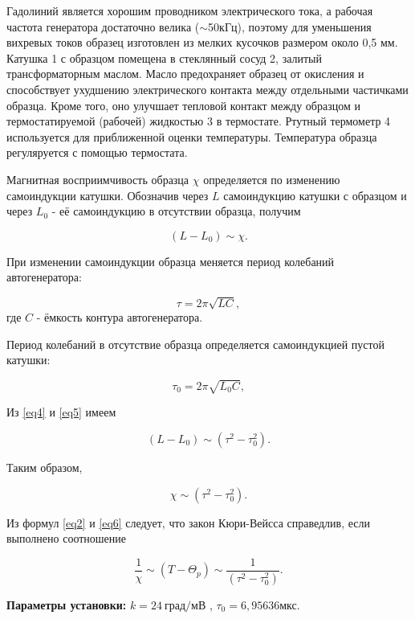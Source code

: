 \documentclass[a4paper, 12pt, twoside]{article}
\begin{document}
Гадолиний является хорошим проводником электрического тока, а рабочая частота генератора достаточно велика ($\sim$50кГц), поэтому для уменьшения вихревых токов образец изготовлен из мелких кусочков размером около 0,5 мм. Катушка 1 с образцом помещена в стеклянный сосуд 2, залитый трансформаторным маслом. Масло предохраняет образец от окисления и способствует ухудшению электрического контакта между отдельными частичками образца. Кроме того, оно улучшает тепловой контакт между образцом и термостатируемой (рабочей) жидкостью 3 в термостате. Ртутный термометр 4 используется для приближенной оценки температуры. Температура образца регуляруется с помощью термостата.

Магнитная восприимчивость образца $\chi$ определяется по изменению самоиндукции катушки. Обозначив через $L$ самоиндукцию катушки с образцом и через $L_0$ - её самоиндукцию в отсутствии образца, получим 

\begin{equation}
(L-L_0) \sim \chi.
\label{eq3}
\end{equation}

При изменении самоиндукции образца меняется период колебаний автогенератора:

\begin{equation}
\tau = 2\pi\sqrt{LC} ,
\label{eq4}
\end{equation}
где $C$ - ёмкость контура автогенератора.

Период колебаний в отсутствие образца определяется самоиндукцией пустой катушки:

\begin{equation}
\tau_0 = 2\pi\sqrt{L_0C} ,
\label{eq5}
\end{equation}

Из \eqref{eq4} и \eqref{eq5} имеем

$$ (L-L_0) \sim (\tau^{2}-\tau_0^{2}). $$

Таким образом,

\begin{equation}
\chi \sim (\tau^{2}-\tau_0^{2}).
\label{eq6}
\end{equation}

Из формул \eqref{eq2} и \eqref{eq6} следует, что закон Кюри-Вейсса справедлив, если выполнено соотношение 

\begin{equation}
\dfrac{1}{\chi} \sim (T- \Theta_p) \sim \dfrac{1}{(\tau^2-\tau_0^2)}.
\label{eq7}
\end{equation}

\textbf{Параметры установки:} $k = 24 ~\text{град/мВ}$ ,
$\tau_0 = 6,95636 \text{мкс}$.
\end{document}
